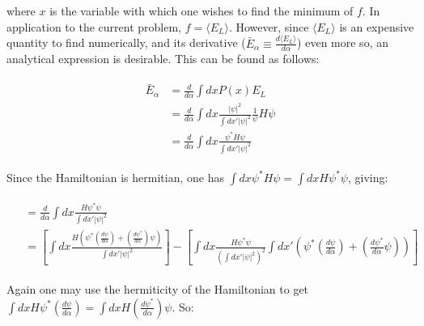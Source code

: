 \documentclass[english, a4paper]{article}
\begin{document}
where $x$ is the variable with which one wishes to find the minimum of $f$. In application to the current problem, $f = \langle E_L\rangle$. However, since $\langle E_L\rangle$ is an expensive quantity to find numerically, and its derivative ($\bar{E}_\alpha \equiv \frac{d\langle E_L\rangle}{d\alpha}$) even more so, an analytical expression is desirable. This can be found as follows:

\begin{align}
\begin{split}
\bar{E}_\alpha &= \frac{d}{d\alpha}\int dx P(x) E_L\\
&= \frac{d}{d\alpha}\int dx \frac{|\psi|^2}{\int dx'|\psi|^2}\frac{1}{\psi}H\psi\\
&= \frac{d}{d\alpha}\int dx \frac{\psi^*H\psi}{\int dx'|\psi|^2}
\end{split}
\end{align}

Since the Hamiltonian is hermitian, one has $\int dx\psi^* H \psi = \int dx H\psi^*\psi$, giving:

\begin{align}
\begin{split}
&= \frac{d}{d\alpha}\int dx \frac{H\psi^*\psi}{\int dx'|\psi|^2}\\
&= \left[ \int dx\frac{H\left(\psi^*\left(\frac{d\psi}{d\alpha}\right) + \left(\frac{d\psi^*}{d\alpha}\right)\psi\right)}{\int dx'|\psi|^2} \right] - \left[ \int dx \frac{H\psi^*\psi}{\left(\int dx'|\psi|^2\right)^2}\int dx'\left( \psi^*\left(\frac{d\psi}{d\alpha}\right) + \left(\frac{d\psi^*}{d\alpha}\psi\right) \right) \right]
\end{split}
\end{align}

Again one may use the hermiticity of the Hamiltonian to get $\int dx H \psi^*\left(\frac{d\psi}{d\alpha}\right) = \int dx H \left(\frac{d\psi^*}{d\alpha}\right)\psi$. So:
\end{document}

